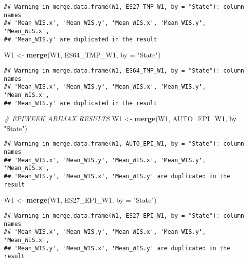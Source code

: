 \documentclass[
]{article}
\newenvironment{Shaded}{\begin{snugshade}}{\end{snugshade}}
\newcommand{\AttributeTok}[1]{\textcolor[rgb]{0.13,0.29,0.53}{#1}}
\newcommand{\CommentTok}[1]{\textcolor[rgb]{0.56,0.35,0.01}{\textit{#1}}}
\newcommand{\FunctionTok}[1]{\textcolor[rgb]{0.13,0.29,0.53}{\textbf{#1}}}
\newcommand{\NormalTok}[1]{#1}
\newcommand{\OtherTok}[1]{\textcolor[rgb]{0.56,0.35,0.01}{#1}}
\newcommand{\StringTok}[1]{\textcolor[rgb]{0.31,0.60,0.02}{#1}}
\begin{document}
\begin{verbatim}
## Warning in merge.data.frame(W1, ES27_TMP_W1, by = "State"): column names
## 'Mean_WIS.x', 'Mean_WIS.y', 'Mean_WIS.x', 'Mean_WIS.y', 'Mean_WIS.x',
## 'Mean_WIS.y' are duplicated in the result
\end{verbatim}

\begin{Shaded}
\begin{Highlighting}[]
\NormalTok{W1 }\OtherTok{\textless{}{-}} \FunctionTok{merge}\NormalTok{(W1, ES64\_TMP\_W1, }\AttributeTok{by =} \StringTok{"State"}\NormalTok{)}
\end{Highlighting}
\end{Shaded}

\begin{verbatim}
## Warning in merge.data.frame(W1, ES64_TMP_W1, by = "State"): column names
## 'Mean_WIS.x', 'Mean_WIS.y', 'Mean_WIS.x', 'Mean_WIS.y', 'Mean_WIS.x',
## 'Mean_WIS.y' are duplicated in the result
\end{verbatim}

\begin{Shaded}
\begin{Highlighting}[]
\CommentTok{\# EPIWEEK ARIMAX RESULTS}
\NormalTok{W1 }\OtherTok{\textless{}{-}} \FunctionTok{merge}\NormalTok{(W1, AUTO\_EPI\_W1, }\AttributeTok{by =} \StringTok{"State"}\NormalTok{)}
\end{Highlighting}
\end{Shaded}

\begin{verbatim}
## Warning in merge.data.frame(W1, AUTO_EPI_W1, by = "State"): column names
## 'Mean_WIS.x', 'Mean_WIS.y', 'Mean_WIS.x', 'Mean_WIS.y', 'Mean_WIS.x',
## 'Mean_WIS.y', 'Mean_WIS.x', 'Mean_WIS.y' are duplicated in the result
\end{verbatim}

\begin{Shaded}
\begin{Highlighting}[]
\NormalTok{W1 }\OtherTok{\textless{}{-}} \FunctionTok{merge}\NormalTok{(W1, ES27\_EPI\_W1, }\AttributeTok{by =} \StringTok{"State"}\NormalTok{)}
\end{Highlighting}
\end{Shaded}

\begin{verbatim}
## Warning in merge.data.frame(W1, ES27_EPI_W1, by = "State"): column names
## 'Mean_WIS.x', 'Mean_WIS.y', 'Mean_WIS.x', 'Mean_WIS.y', 'Mean_WIS.x',
## 'Mean_WIS.y', 'Mean_WIS.x', 'Mean_WIS.y' are duplicated in the result
\end{verbatim}
\end{document}
